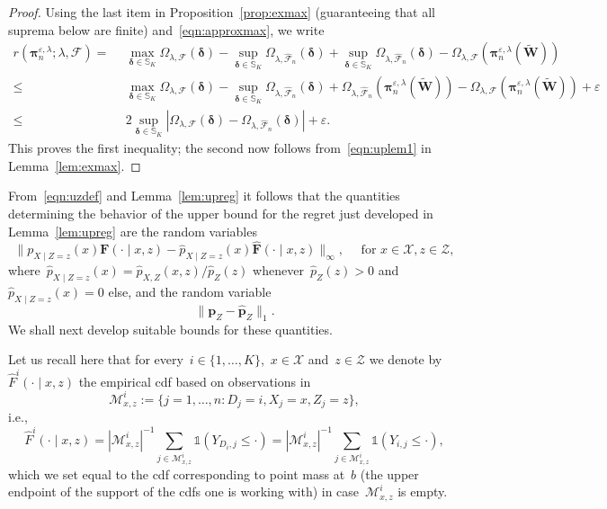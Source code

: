 \documentclass[11pt, a4paper]{article}
\theoremstyle{definition}
\begin{document}
\begin{proof}
Using the last item in Proposition~\ref{prop:exmax} (guaranteeing that all suprema below are finite) and~\eqref{eqn:approxmax}, we write
%
\begin{align*}r(\bm{\pi}^{\varepsilon, \lambda}_n; \lambda, \mathcal{F}) =
&~~\max_{\bm{\delta} \in \mathbb{S}_K} \Omega_{\lambda, \mathcal{F}}(\bm{\delta}) - \sup_{\bm{\delta} \in \mathbb{S}_K} \Omega_{\lambda, \hat{\mathcal{F}}_n}(\bm{\delta}) + \sup_{\bm{\delta} \in \mathbb{S}_K} \Omega_{\lambda, \hat{\mathcal{F}}_n}(\bm{\delta}) - \Omega_{ \lambda, \mathcal{F}} \left(\bm{\pi}^{\varepsilon, \lambda}_n(\tilde{\bm{W}})\right) \\
\leq & ~~
\max_{\bm{\delta} \in \mathbb{S}_K} \Omega_{\lambda, \mathcal{F}}(\bm{\delta}) - \sup_{\bm{\delta} \in \mathbb{S}_K} \Omega_{\lambda, \hat{\mathcal{F}}_n}(\bm{\delta}) + \Omega_{\lambda, \hat{\mathcal{F}}_n}(\bm{\pi}^{\varepsilon,\lambda}_n(\tilde{\bm{W}})) - \Omega_{\lambda, \mathcal{F}} \left(\bm{\pi}^{\varepsilon, \lambda}_n(\tilde{\bm{W}})\right) + \varepsilon \\
\leq & ~~2 \sup_{\bm{\delta} \in \mathbb{S}_K} |\Omega_{\lambda, \mathcal{F}}(\bm{\delta}) - \Omega_{\lambda, \hat{\mathcal{F}}_n}(\bm{\delta})| + \varepsilon.
\end{align*}
%
This proves the first inequality; the second now follows from~\eqref{eqn:uplem1} in Lemma~\ref{lem:exmax}.
\end{proof}

From~\eqref{eqn:uzdef} and Lemma~\ref{lem:upreg} it follows that the quantities determining the behavior of the upper bound for the regret just developed in Lemma~\ref{lem:upreg} are the random variables~
\begin{equation}\label{eqn:pFdef}
\|p_{X\mid Z=z}(x) \bm{F}(\cdot \mid  x, z) - \hat{p}_{X\mid Z=z}(x) \hat{\bm{F}}(\cdot \mid  x, z)\|_{\infty}, \quad \text{ for } x \in \mathcal{X}, z \in \mathcal{Z},
\end{equation}
where~$\hat{p}_{X\mid Z=z}(x) = \hat{p}_{X, Z}(x, z)/\hat{p}_Z(z)$ whenever~$\hat{p}_Z(z) > 0$ and~$\hat{p}_{X\mid Z=z}(x) = 0$ else, and the random variable~$$\|\bm{p}_Z - \hat{\bm{p}}_Z\|_1.$$ We shall next develop suitable bounds for these quantities. 

Let us recall here that for every~$i \in \{1, \hdots, K\}$,~$x \in \mathcal{X}$ and~$z \in \mathcal{Z}$ we denote by~$\hat{F}^i(\cdot\mid x, z)$ the empirical cdf based on observations in~
\begin{equation}
\mathcal{M}^i_{x, z} := \{j = 1, \hdots, n: D_j = i, X_j = x, Z_j = z\},
\end{equation}
%
i.e.,~$$\hat{F}^i(\cdot\mid x, z) = |\mathcal{M}^i_{x, z}|^{-1} \sum_{j \in \mathcal{M}^i_{x, z}}  \mathds{1}( Y_{D_i, j} \leq \cdot) = |\mathcal{M}^i_{x, z}|^{-1} \sum_{j \in \mathcal{M}^i_{x, z}}  \mathds{1}( Y_{i,j} \leq \cdot),$$ which we set equal to the cdf corresponding to point mass at~$b$ (the upper endpoint of the support of the cdfs one is working with) in case~$\mathcal{M}^i_{x, z}$ is empty. 
\end{document}
